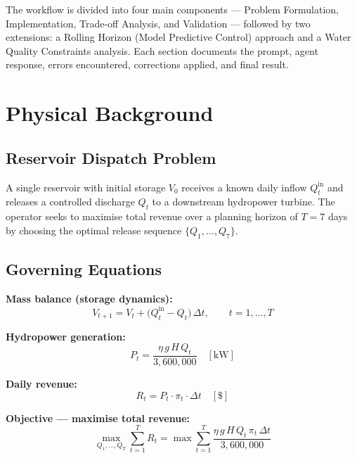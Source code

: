 \documentclass[12pt, a4paper]{article}
\begin{document}
The workflow is divided into four main components — Problem Formulation, Implementation, Trade-off Analysis, and Validation — followed by two extensions: a Rolling Horizon (Model Predictive Control) approach and a Water Quality Constraints analysis. Each section documents the prompt, agent response, errors encountered, corrections applied, and final result.

\section{Physical Background}

\subsection{Reservoir Dispatch Problem}

A single reservoir with initial storage $V_0$ receives a known daily inflow $Q^{\text{in}}_t$ and releases a controlled discharge $Q_t$ to a downstream hydropower turbine. The operator seeks to maximise total revenue over a planning horizon of $T = 7$ days by choosing the optimal release sequence $\{Q_1, \ldots, Q_7\}$.

\subsection{Governing Equations}

\textbf{Mass balance (storage dynamics):}
\begin{equation}
  V_{t+1} = V_t + \bigl(Q^{\text{in}}_t - Q_t\bigr)\,\Delta t, \qquad t = 1, \ldots, T
\end{equation}

\textbf{Hydropower generation:}
\begin{equation}
  P_t = \frac{\eta\, g\, H\, Q_t}{3{,}600{,}000} \quad [\text{kW}]
\end{equation}

\textbf{Daily revenue:}
\begin{equation}
  R_t = P_t \cdot \pi_t \cdot \Delta t \quad [\$]
\end{equation}

\textbf{Objective — maximise total revenue:}
\begin{equation}
  \max_{Q_1,\ldots,Q_T} \sum_{t=1}^{T} R_t
  = \max \sum_{t=1}^{T} \frac{\eta\, g\, H\, Q_t\, \pi_t\, \Delta t}{3{,}600{,}000}
\end{equation}
\end{document}
